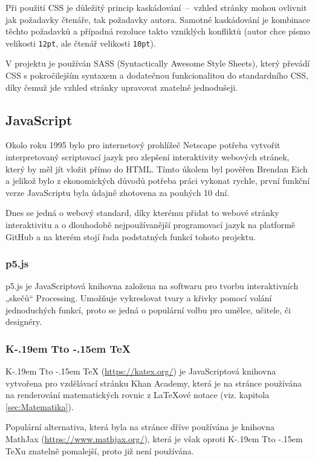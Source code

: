 \documentclass[a4paper, 12pt]{article}
\makeatletter
\DeclareRobustCommand{\KaTeX}{%
  K\kern -.19em
  {\sbox \z@ T\vbox to\ht \z@ {\hbox{%
  \check@mathfonts
  \fontsize\sf@size\z@
  \selectfont A}%
  \vss}%
}\kern -.15em
\TeX}
\makeatother
\begin{document}
  Při použití CSS je důležitý princip kaskádování~--~vzhled stránky mohou ovlivnit jak požadavky čtenáře, tak požadavky autora. Samotné kaskádování je kombinace těchto požadavků a případná rezoluce takto vzniklých konfliktů (autor chce písmo velikosti \texttt{12pt}, ale čtenář velikosti \texttt{10pt}).

  V projektu je používán SASS (Syntactically Awesome Style Sheets), který převádí CSS s pokročilejším syntaxem a dodatečnou funkcionalitou do standardního CSS, díky čemuž jde vzhled stránky upravovat znatelně jednodušeji.


  \subsection{JavaScript}
  Okolo roku 1995 bylo pro internetový prohlížeč Netscape potřeba vytvořit interpretovaný scriptovací jazyk pro zlepšení interaktivity webových stránek, který by měl jít vložit přímo do HTML. Tímto úkolem byl pověřen Brendan Eich a jelikož bylo z ekonomických důvodů potřeba práci vykonat rychle, první funkční verze JavaScriptu byla údajně zhotovena za pouhých 10 dní\cite{the-origin-of-javascript}.

  Dnes se jedná o webový standard, díky kterému přidat to webové stránky interaktivitu a o dlouhodobě nejpoužívanější programovací jazyk na platformě GitHub\cite{github-statistics} a na kterém stojí řada podstatných funkcí tohoto projektu. %


  \subsubsection{p5.js} \label{sec:p5.js}
  p5.js je JavaScriptová knihovna založena na softwaru pro tvorbu interaktivních „skečů“ Processing. Umožňuje vykreslovat tvary a křivky pomocí volání jednoduchých funkcí, proto se jedná o populární volbu pro umělce, učitele, či designéry.


  \subsubsection{\texorpdfstring{\KaTeX}{KaTeX}} \label{sec:KaTeX}
  \KaTeX{} (\url{https://katex.org/}) je JavaScriptová knihovna vytvořena pro vzdělávací stránku Khan Academy, která je na stránce používána na renderování matematických rovnic z \LaTeX ové notace (viz. kapitola \ref{sec:Matematika}).

  Populární alternativa, která byla na stránce dříve používána je knihovna MathJax (\url{https://www.mathjax.org/}), která je však oproti \KaTeX u znatelně pomalejší\cite{katex-mathjax-comparison}, proto již není používána.
\end{document}
